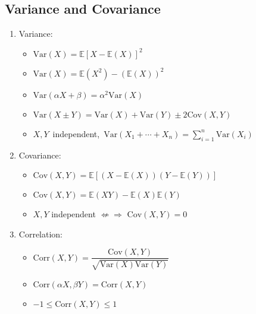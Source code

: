 \documentclass[%
 aip,
 jmp,%
 amsmath,amssymb,
 reprint,%
]{revtex4-1}
\def\E{\mathbb{E}}
\def\Var{\mathrm{Var}}
\def\Cov{\mathrm{Cov}}
\def\Corr{\mathrm{Corr}}
\begin{document}
\subsection{Variance and Covariance}
\begin{enumerate}
    \item Variance:
        \begin{itemize}
            \item $\Var(X) = \E[X - \E(X)]^2$
            \item $\Var(X) = \E(X^2) - (\E(X))^2$
            \item $\Var(\alpha X + \beta) = \alpha^2 \Var(X)$
            \item $\Var(X\pm Y) = \Var(X) + \Var(Y) \pm 2\Cov(X,Y)$
            \item \mbox{$X,Y$ independent, $\Var(X_1+\cdots+X_n) = \sum_{i=1}^n \Var(X_i)$}
        \end{itemize}

    \item Covariance:
        \begin{itemize}
            \item $\Cov(X,Y) = \E[(X - \E(X))(Y - \E(Y))]$
            \item $\Cov(X,Y) = \E(XY) - \E(X)\E(Y)$
            \item $X,Y$ independent $\not\Leftarrow\Rightarrow$ $\Cov(X,Y)=0$
        \end{itemize}

    \item Correlation:
        \begin{itemize}
            \item $\Corr(X,Y) = \dfrac{\Cov(X,Y)}{\sqrt{\Var(X)\Var(Y)}}$
            \item $\Corr(\alpha X, \beta Y) = \Corr(X,Y)$
            \item $-1 \le \Corr(X,Y) \le 1$ \\
        \end{itemize}

\end{enumerate}
\end{document}
